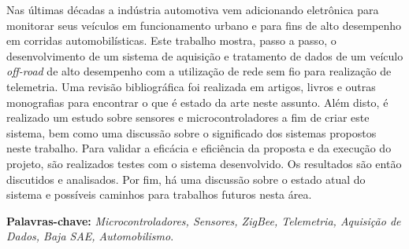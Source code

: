 

\noindent Nas últimas décadas a indústria automotiva vem adicionando eletrônica para monitorar seus veículos em funcionamento urbano e para fins de alto desempenho em corridas automobilísticas. Este trabalho mostra, passo a passo, o desenvolvimento de um sistema de aquisição e tratamento de dados de um veículo \textit{off-road} de alto desempenho com a utilização de rede sem fio para realização de telemetria. Uma revisão bibliográfica foi realizada em artigos, livros e outras monografias para encontrar o que é estado da arte neste assunto. Além disto, é realizado um estudo sobre sensores e microcontroladores a fim de criar este sistema, bem como uma discussão sobre o significado dos sistemas propostos neste trabalho. Para validar a eficácia e eficiência da proposta e da execução do projeto, são realizados testes com o sistema desenvolvido. Os resultados são então discutidos e analisados. Por fim, há uma discussão sobre o estado atual do sistema e possíveis caminhos para trabalhos futuros nesta área.



\textbf{Palavras-chave:} \textit{Microcontroladores, Sensores, ZigBee, Telemetria, Aquisição de Dados, Baja SAE, Automobilismo}.


